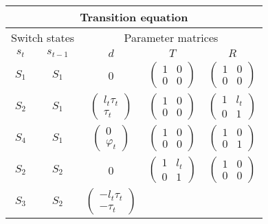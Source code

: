 \documentclass[12pt]{article}
\begin{document}
\begin{table}[h!]
\centering
\begin{tabular}[h!]{cc|ccc}
  \hline\hline
  \multicolumn{5}{c}{Transition equation}\\
  \hline
  \multicolumn{2}{c|}{Switch states} & \multicolumn{3}{c}{Parameter
                                      matrices}\\
  $s_{t}$ & $s_{t-1}$ & $d$ & $T$ & $R$ \\
  \hline
  $S_1$ &  $S_1$ & 0 & $\begin{pmatrix}1&0\\0&0\end{pmatrix}$ 
                 & $\begin{pmatrix}1&0\\0&0\end{pmatrix}$\\
  $S_2$ & $S_1$ & $\begin{pmatrix} l_t\tau_t\\ \tau_t\end{pmatrix}$ 
                                    & $\begin{pmatrix} 1 & 0 \\ 0 &
                                      0 \end{pmatrix}$ 
          & $\begin{pmatrix} 1 & l_t\\ 0 & 1 \end{pmatrix}$\\
  $S_4$ & $S_1$ & $\begin{pmatrix}0\\\varphi_t\end{pmatrix}$ 
                                     & $\begin{pmatrix}1&0\\0&0\end{pmatrix}$
          & $\begin{pmatrix}1&0\\0&1\end{pmatrix}$\\
  $S_2$ & $S_2$ & 0 & $\begin{pmatrix} 1 & l_t \\ 0 & 1 \end{pmatrix}$ 
        & $\begin{pmatrix}1&0\\0&0\end{pmatrix}$\\
  $S_3$ & $S_2$ & $\begin{pmatrix} -l_t\tau_t\\ -\tau_t\end{pmatrix}$ 

\end{tabular}
\end{table}
\end{document}
